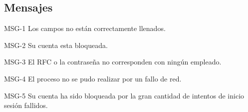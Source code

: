 \subsection{Mensajes}

\begin{Citemize}
	\item MSG-1 Los campos no están correctamente llenados. 
	\item MSG-2 Su cuenta esta bloqueada. 
	\item MSG-3 El RFC o la contraseña no corresponden con ningún empleado. 
	\item MSG-4 El proceso no se pudo realizar por un fallo de red. 
	\item MSG-5 Su cuenta ha sido bloqueada por la gran cantidad de intentos de inicio sesión fallidos.
\end{Citemize}

